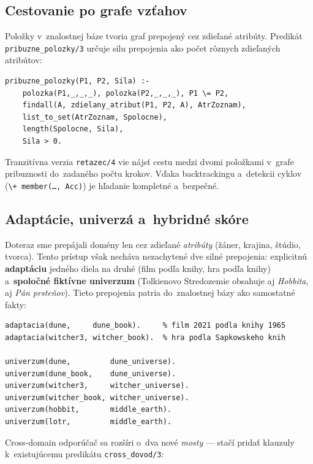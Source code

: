 \documentclass[11pt,a4paper]{article}
\begin{document}
\subsection{Cestovanie po grafe vzťahov}
\label{sec:graf}

Položky v~znalostnej báze tvoria graf prepojený cez zdieľané
atribúty. Predikát \texttt{pribuzne\_polozky/3} určuje silu
prepojenia ako počet rôznych zdieľaných atribútov:

\begin{lstlisting}
pribuzne_polozky(P1, P2, Sila) :-
    polozka(P1,_,_,_), polozka(P2,_,_,_), P1 \= P2,
    findall(A, zdielany_atribut(P1, P2, A), AtrZoznam),
    list_to_set(AtrZoznam, Spolocne),
    length(Spolocne, Sila),
    Sila > 0.
\end{lstlisting}

\noindent
Tranzitívna verzia \texttt{retazec/4} vie nájsť cestu medzi
dvomi položkami v~grafe pribuznosti do~zadaného počtu krokov.
Vďaka backtrackingu a~detekcii cyklov (\texttt{\textbackslash+
member(\dots, Acc)}) je hľadanie kompletné a~bezpečné.

\subsection{Adaptácie, univerzá a~hybridné skóre}
\label{sec:hybrid}

Doteraz sme prepájali domény len cez zdieľané \emph{atribúty}
(žáner, krajina, štúdio, tvorca). Tento prístup však necháva
nezachytené dve silné prepojenia: explicitnú \textbf{adaptáciu}
jedného diela na druhé (film podľa knihy, hra podľa knihy)
a~\textbf{spoločné fiktívne univerzum} (Tolkienovo Stredozemie
obsahuje aj \emph{Hobbita}, aj \emph{Pán prsteňov}). Tieto
prepojenia patria do~znalostnej bázy ako samostatné fakty:

\begin{lstlisting}[caption={Adaptácie a~univerzá}]
adaptacia(dune,     dune_book).     % film 2021 podla knihy 1965
adaptacia(witcher3, witcher_book).  % hra podla Sapkowskeho knih

univerzum(dune,         dune_universe).
univerzum(dune_book,    dune_universe).
univerzum(witcher3,     witcher_universe).
univerzum(witcher_book, witcher_universe).
univerzum(hobbit,       middle_earth).
univerzum(lotr,         middle_earth).
\end{lstlisting}

\noindent
Cross-domain odporúčač sa rozšíri o~dva nové \emph{mosty} ---
stačí pridať klauzuly k~existujúcemu predikátu \texttt{cross\_dovod/3}:
\end{document}
